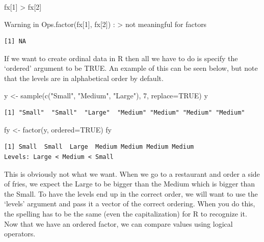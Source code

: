 \documentclass[
  letterpaper,
  DIV=11,
  numbers=noendperiod]{scrreprt}
\newenvironment{Shaded}{\begin{snugshade}}{\end{snugshade}}
\newcommand{\AttributeTok}[1]{\textcolor[rgb]{0.40,0.45,0.13}{#1}}
\newcommand{\ConstantTok}[1]{\textcolor[rgb]{0.56,0.35,0.01}{#1}}
\newcommand{\DecValTok}[1]{\textcolor[rgb]{0.68,0.00,0.00}{#1}}
\newcommand{\FunctionTok}[1]{\textcolor[rgb]{0.28,0.35,0.67}{#1}}
\newcommand{\NormalTok}[1]{\textcolor[rgb]{0.00,0.23,0.31}{#1}}
\newcommand{\OtherTok}[1]{\textcolor[rgb]{0.00,0.23,0.31}{#1}}
\newcommand{\SpecialCharTok}[1]{\textcolor[rgb]{0.37,0.37,0.37}{#1}}
\newcommand{\StringTok}[1]{\textcolor[rgb]{0.13,0.47,0.30}{#1}}
\begin{document}
\begin{Shaded}
\begin{Highlighting}[]
\NormalTok{fx[}\DecValTok{1}\NormalTok{] }\SpecialCharTok{\textgreater{}}\NormalTok{ fx[}\DecValTok{2}\NormalTok{]}
\end{Highlighting}
\end{Shaded}

{Warning in Ops.factor(fx{[}1{]}, fx{[}2{]}) :
\textquotesingle\textgreater\textquotesingle{} not meaningful for
factors}

\begin{verbatim}
[1] NA
\end{verbatim}

If we want to create ordinal data in R then all we have to do is specify
the `ordered' argument to be TRUE. An example of this can be seen below,
but note that the levels are in alphabetical order by default.

\begin{Shaded}
\begin{Highlighting}[]
\NormalTok{y }\OtherTok{\textless{}{-}} \FunctionTok{sample}\NormalTok{(}\FunctionTok{c}\NormalTok{(}\StringTok{"Small"}\NormalTok{, }\StringTok{"Medium"}\NormalTok{, }\StringTok{"Large"}\NormalTok{), }\DecValTok{7}\NormalTok{, }\AttributeTok{replace=}\ConstantTok{TRUE}\NormalTok{)}
\NormalTok{y}
\end{Highlighting}
\end{Shaded}

\begin{verbatim}
[1] "Small"  "Small"  "Large"  "Medium" "Medium" "Medium" "Medium"
\end{verbatim}

\begin{Shaded}
\begin{Highlighting}[]
\NormalTok{fy }\OtherTok{\textless{}{-}} \FunctionTok{factor}\NormalTok{(y, }\AttributeTok{ordered=}\ConstantTok{TRUE}\NormalTok{)}
\NormalTok{fy}
\end{Highlighting}
\end{Shaded}

\begin{verbatim}
[1] Small  Small  Large  Medium Medium Medium Medium
Levels: Large < Medium < Small
\end{verbatim}

This is obviously not what we want. When we go to a restaurant and order
a side of fries, we expect the Large to be bigger than the Medium which
is bigger than the Small. To have the levels end up in the correct
order, we will want to use the `levels' argument and pass it a vector of
the correct ordering. When you do this, the spelling has to be the same
(even the capitalization) for R to recognize it. Now that we have an
ordered factor, we can compare values using logical operators.
\end{document}
